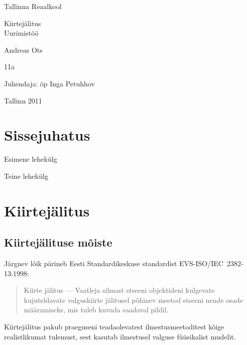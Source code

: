 \documentclass[a4paper,12pt]{report}
\begin{document}
\begin{center}
Tallinna Reaalkool

\vfill

Kiirtejälitus\\
Uurimistöö

\vfill

\end{center}

\begin{raggedleft}

Andreas Ots

11a

Juhendaja: õp Inga Petuhhov

\end{raggedleft}

\vfill

\begin{center}

Tallinn 2011

\end{center}
\clearpage

\tableofcontents
\listoffigures
\listoftables
\lstlistoflistings

\chapter*{Sissejuhatus}
\pagestyle{plain}
\thispagestyle{empty}
Esimene lehekülg

\clearpage

Teine lehekülg

\chapter{Kiirtejälitus}
\section{Kiirtejälituse mõiste}
Järgnev lõik pärineb Eesti Standardikeskuse standardist EVS-ISO/IEC~2382-13:1998:
\begin{quote}
Kiirte jälitus --- Vaatleja silmast stseeni objektideni kulgevate
kujuteldavate valguskiirte jälitusel põhinev meetod stseeni nende osade
määramiseks, mis tuleb kuvada saadaval pildil.\cite{ISO:2382-13}
\end{quote}

Kiirtejälitus pakub praeguseni teadaolevatest ilmestusmeetoditest kõige
realistlikumat tulemust, sest kasutab ilmestusel valguse füüsikalist
mudelit.
\end{document}

